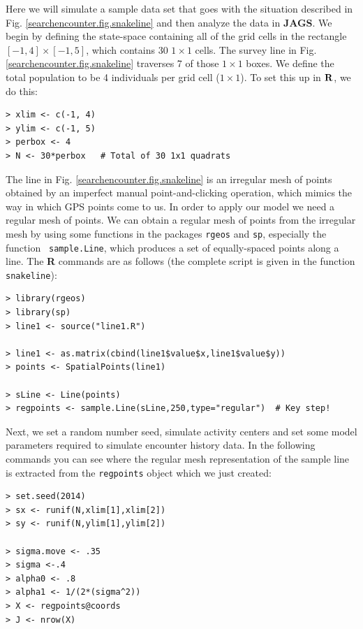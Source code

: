 Here we will simulate a sample data set that goes with the situation
described in Fig. \ref{searchencounter.fig.snakeline} and then
analyze the data in {\bf JAGS}.  We begin by defining the state-space
containing all of the grid cells in the rectangle $[-1,4] \times
[-1,5]$, which contains 30 $1 \times 1$ cells. The survey line in
Fig. \ref{searchencounter.fig.snakeline} traverses 7 of those $1
\times 1$ boxes.  We define the total population to be
 4 individuals per grid cell ($1 \times 1$). To set this up in ${\bf
   R}$, we do this:
\begin{verbatim}
> xlim <- c(-1, 4)
> ylim <- c(-1, 5)
> perbox <- 4
> N <- 30*perbox   # Total of 30 1x1 quadrats
\end{verbatim}
The line in Fig. \ref{searchencounter.fig.snakeline} is an irregular
mesh of points obtained by an imperfect manual point-and-clicking
operation, which mimics the
way in which GPS points come to us. In order to apply our model we
need a regular mesh of points. We can obtain a regular mesh of points
from the irregular mesh by using some functions in the packages
\mbox{\tt rgeos} and \mbox{\tt sp}, especially the function \mbox{\tt
  sample.Line}, which produces a set of equally-spaced points along a
line. The {\bf R} commands are as follows
(the complete script is
given in the function \mbox{\tt snakeline}):
\begin{verbatim}
> library(rgeos)
> library(sp)
> line1 <- source("line1.R")

> line1 <- as.matrix(cbind(line1$value$x,line1$value$y))
> points <- SpatialPoints(line1)

> sLine <- Line(points)
> regpoints <- sample.Line(sLine,250,type="regular")  # Key step!
\end{verbatim}
Next, we set a random number seed, simulate activity centers and set
some model parameters required to simulate encounter history data.
In the following commands you can see where the
regular mesh representation of the sample line is extracted from the
\mbox{\tt regpoints} object which we just created:
\begin{verbatim}
> set.seed(2014)
> sx <- runif(N,xlim[1],xlim[2])
> sy <- runif(N,ylim[1],ylim[2])

> sigma.move <- .35
> sigma <-.4
> alpha0 <- .8
> alpha1 <- 1/(2*(sigma^2))
> X <- regpoints@coords
> J <- nrow(X)
\end{verbatim}

